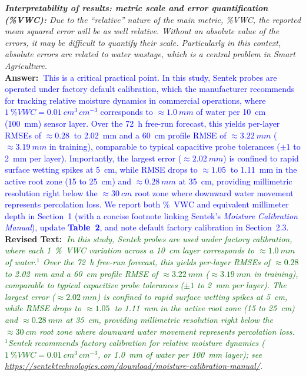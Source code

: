 \documentclass[10pt]{article}
\newcommand{\query}[2][]{\ifthenelse{\equal{#1}{}}{}{\textbf{#1:}~}\emph{#2}}
\newcommand{\ans}[1]{\textbf{Answer:~}#1}
\newcommand{\Rtext}[1]{\textbf{Revised Text:~}#1}
\begin{document}
\query[R-1.3a]{\textbf{Interpretability of results: metric scale and error quantification (\%VWC):} Due to the ``relative'' nature of the main metric, \%VWC, the reported mean squared error will be as well relative. Without an absolute value of the errors, it may be difficult to quantify their scale. Particularly in this context, absolute errors are related to water wastage, which is a central problem in Smart Agriculture.}\\
\ans{\textcolor{blue}{This is a critical practical point. In this study, Sentek probes are operated under factory default calibration, which the manufacturer recommends for tracking relative moisture dynamics in commercial operations, where $\SI{1}{\%VWC} = \SI{0.01}{cm^3\,cm^{-3}}$ corresponds to $\approx\SI{1.0}{mm}$ of water per \SI{10}{cm} (\SI{100}{mm}) sensor layer. Over the 72~\si{h} free-run forecast, this yields per-layer RMSEs of $\approx\SI{0.28}{}$ to \SI{2.02}{mm} and a \SI{60}{cm} profile RMSE of $\approx\SI{3.22}{mm}$ ($\approx\SI{3.19}{mm}$ in training), comparable to typical capacitive probe tolerances ($\pm 1$ to \SI{2}{mm} per layer). Importantly, the largest error ($\approx\SI{2.02}{mm}$) is confined to rapid surface wetting spikes at 5~\si{cm}, while RMSE drops to $\approx\SI{1.05}{}$ to \SI{1.11}{mm} in the active root zone (15 to 25~\si{cm}) and $\approx\SI{0.28}{mm}$ at 35~\si{cm}, providing millimetric resolution right below the $\approx\SI{30}{cm}$ root zone where downward water movement represents percolation loss. We report both \si{\%VWC} and equivalent millimeter depth in Section~1 (with a concise footnote linking Sentek's \emph{Moisture Calibration Manual}), update \textbf{Table~2}, and note default factory calibration in Section~2.3.}}\\
\Rtext{\emph{\textcolor{darkgreen}{In this study, Sentek probes are used under factory calibration, where each \SI{1}{\%VWC} variation across a \SI{10}{cm} layer corresponds to $\approx\SI{1.0}{mm}$ of water.$^{1}$ Over the 72~\si{h} free-run forecast, this yields per-layer RMSEs of $\approx\SI{0.28}{}$ to \SI{2.02}{mm} and a \SI{60}{cm} profile RMSE of $\approx\SI{3.22}{mm}$ ($\approx\SI{3.19}{mm}$ in training), comparable to typical capacitive probe tolerances ($\pm 1$ to \SI{2}{mm} per layer). The largest error ($\approx\SI{2.02}{mm}$) is confined to rapid surface wetting spikes at 5~\si{cm}, while RMSE drops to $\approx\SI{1.05}{}$ to \SI{1.11}{mm} in the active root zone (15 to 25~\si{cm}) and $\approx\SI{0.28}{mm}$ at 35~\si{cm}, providing millimetric resolution right below the $\approx\SI{30}{cm}$ root zone where downward water movement represents percolation loss.\\
{\footnotesize $^{1}$Sentek recommends factory calibration for relative moisture dynamics ($\SI{1}{\%VWC} = \SI{0.01}{cm^3\,cm^{-3}}$, or \SI{1.0}{mm} of water per \SI{100}{mm} layer); see \url{https://sentektechnologies.com/download/moisture-calibration-manual/}.}}}}
\end{document}
